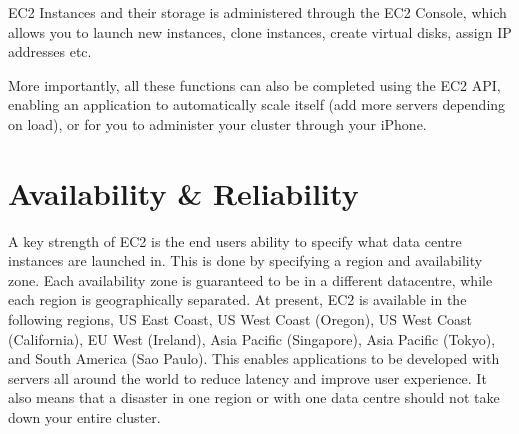 EC2 Instances and their storage is administered through the EC2 Console, which allows you to launch new instances, clone instances, create virtual disks, assign IP addresses etc. 

More importantly, all these functions can also be completed using the EC2 API, enabling an application to automatically scale itself (add more servers depending on load), or for you to administer your cluster through your iPhone.

\section{Availability \& Reliability}
A key strength of EC2 is the end users ability to specify what data centre instances are launched in. This is done by specifying a region and availability zone. Each availability zone is guaranteed to be in a different datacentre, while each region is geographically separated. At present, EC2 is available in the following regions, US East Coast, US West Coast (Oregon), US West Coast (California), EU West (Ireland), Asia Pacific (Singapore), Asia Pacific (Tokyo), and South America (Sao Paulo). This enables applications to be developed with servers all around the world to reduce latency and improve user experience. It also means that a disaster in one region or with one data centre should not take down your entire cluster.

